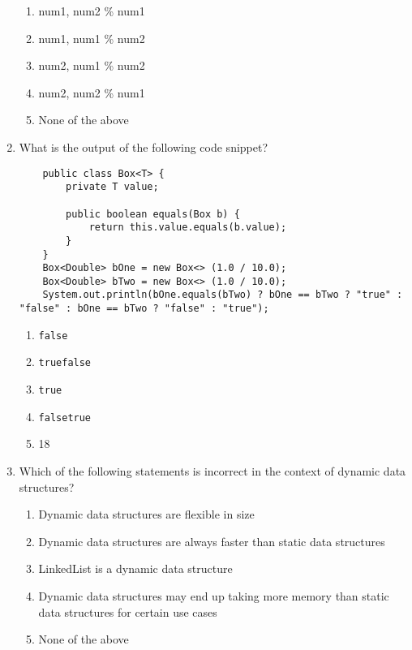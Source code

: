 \documentclass[S17-Final.tex]{subfiles}
\begin{document}
\begin{enumerate}
\begin{enumerate}
\item  num1, num2 \% num1
\item  num1, num1 \% num2
\item  num2, num1 \% num2
\item  num2, num2 \% num1
\item  None of the above
\end{enumerate}
\clearpage
\item What is the output of the following code snippet?
\begin{lstlisting}
    public class Box<T> {
        private T value;
        
        public boolean equals(Box b) {
            return this.value.equals(b.value);
        }
    }
    Box<Double> bOne = new Box<> (1.0 / 10.0);
    Box<Double> bTwo = new Box<> (1.0 / 10.0);
    System.out.println(bOne.equals(bTwo) ? bOne == bTwo ? "true" : "false" : bOne == bTwo ? "false" : "true");
\end{lstlisting}
	
\begin{enumerate}
\item  \texttt{false}
\item  \texttt{truefalse}
\item  \texttt{true}
\item  \texttt{falsetrue}
\item  18
\end{enumerate}

\item Which of the following statements is incorrect in the context of dynamic data structures?
	
\begin{enumerate}
\item  Dynamic data structures are flexible in size
\item  Dynamic data structures are always faster than static data structures
\item  LinkedList is a dynamic data structure
\item  Dynamic data structures may end up taking more memory than static data structures for certain use cases
\item  None of the above
\end{enumerate}
\clearpage
    

\end{enumerate}
\end{document}
